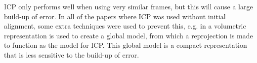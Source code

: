 \documentclass[a4paper]{article}
\begin{document}
\ac{ICP} only performs well when using very similar frames, but this will cause a large build-up of error. In all of the papers where \ac{ICP} was used without initial alignment, some extra techniques were used to prevent this, e.g. in \cite{izadi2011kinectfusion} a volumetric representation is used to create a global model, from which a reprojection is made to function as the model for \ac{ICP}. This global model is a compact representation that is less sensitive to the build-up of error.






{}

\end{document}
